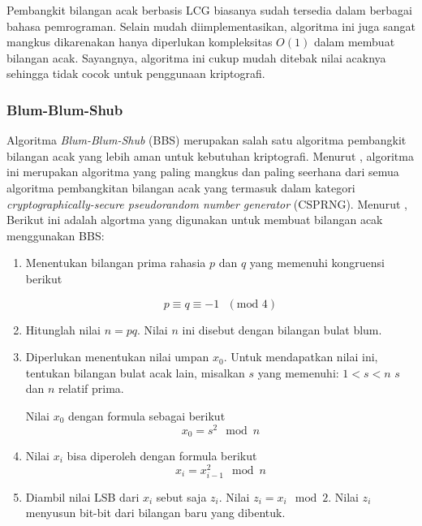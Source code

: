 \documentclass[10pt,conference]{IEEEtran}
\theoremstyle{definition}
\begin{document}
Pembangkit bilangan acak berbasis LCG biasanya sudah tersedia  dalam berbagai bahasa pemrograman. Selain mudah diimplementasikan, algoritma ini juga sangat mangkus dikarenakan hanya diperlukan kompleksitas $O(1)$ dalam membuat bilangan acak. Sayangnya, algoritma ini cukup mudah ditebak nilai acaknya sehingga tidak cocok untuk penggunaan kriptografi. \cite{b1}

\subsubsection{Blum-Blum-Shub}

Algoritma \emph{Blum-Blum-Shub} (BBS) merupakan salah satu algoritma pembangkit bilangan acak yang lebih aman untuk kebutuhan kriptografi. Menurut \cite{b1}, algoritma ini merupakan algoritma yang paling mangkus dan paling seerhana dari semua algoritma pembangkitan bilangan acak yang termasuk dalam kategori \emph{cryptographically-secure pseudorandom number generator} (CSPRNG). Menurut \cite{b1}, Berikut ini adalah algortma yang digunakan untuk membuat bilangan acak menggunakan BBS:

\begin{enumerate}
    \item Menentukan bilangan prima rahasia $p$ dan $q$ yang memenuhi kongruensi berikut

    \begin{equation} \label{eq:bbs1}
        p \equiv q \equiv -1 \text{ }(\text{mod } 4) 
    \end{equation}
    \item Hitunglah nilai $n = pq$. Nilai $n$ ini disebut dengan bilangan bulat blum. 
    \item Diperlukan menentukan nilai umpan $x_0$. Untuk mendapatkan nilai ini, tentukan bilangan bulat acak lain, misalkan $s$ yang memenuhi:
    \subitem $1 < s < n$
    \subitem $s$ dan $n$ relatif prima.

    Nilai $x_0$ dengan formula sebagai berikut 
    \begin{equation} \label{eq:bbs2}
        x_0 = s^2 \mod n
    \end{equation}
    \item Nilai $x_i$ bisa diperoleh dengan formula berikut
    \begin{equation} \label{eq:bbs3}
        x_i = x_{i-1}^2 \mod n
    \end{equation}
    \item Diambil nilai LSB dari $x_i$ sebut saja $z_i$. Nilai $z_i = x_i \mod 2$. Nilai $z_i$ menyusun bit-bit dari bilangan baru yang dibentuk.
\end{enumerate}
\end{document}
